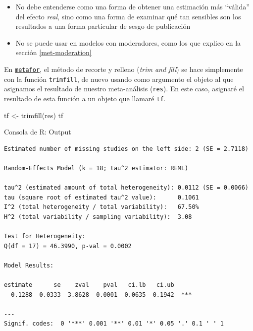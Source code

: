 \documentclass[
  bookmarksnumbered]{article}
\newenvironment{Shaded}{\begin{snugshade}}{\end{snugshade}}
\newcommand{\FunctionTok}[1]{\textcolor[rgb]{0.39,0.29,0.61}{#1}}
\newcommand{\NormalTok}[1]{\textcolor[rgb]{0.12,0.11,0.11}{#1}}
\newcommand{\OtherTok}[1]{\textcolor[rgb]{0.00,0.43,0.16}{#1}}
\begin{document}
\begin{itemize}
\item
  No debe entenderse como una forma de obtener una estimación más ``válida'' del efecto \emph{real}, sino como una forma de examinar qué tan sensibles son los resultados a una forma particular de sesgo de publicación
\item
  No se puede usar en modelos con moderadores, como los que explico en la sección \ref{met-moderation}
\end{itemize}

En \href{https://www.metafor-project.org/doku.php}{\texttt{metafor}}, el método de recorte y relleno (\emph{trim and fill}) se hace simplemente con la función \texttt{trimfill}, de nuevo usando como argumento el objeto al que asignamos el resultado de nuestro meta-análisis (\texttt{res}). En este caso, asignaré el resultado de esta función a un objeto que llamaré \texttt{tf}.

\begin{Shaded}
\begin{Highlighting}[]
\NormalTok{tf }\OtherTok{\textless{}{-}} \FunctionTok{trimfill}\NormalTok{(res)}
\NormalTok{tf}
\end{Highlighting}
\end{Shaded}

\begin{ROut}{Consola de R: Output~\thetcbcounter}
                \begin{footnotesize}
                \begin{verbatim} 
Estimated number of missing studies on the left side: 2 (SE = 2.7118)

Random-Effects Model (k = 18; tau^2 estimator: REML)

tau^2 (estimated amount of total heterogeneity): 0.0112 (SE = 0.0066)
tau (square root of estimated tau^2 value):      0.1061
I^2 (total heterogeneity / total variability):   67.50%
H^2 (total variability / sampling variability):  3.08

Test for Heterogeneity:
Q(df = 17) = 46.3990, p-val = 0.0002

Model Results:

estimate      se    zval    pval   ci.lb   ci.ub      
  0.1288  0.0333  3.8628  0.0001  0.0635  0.1942  *** 

---
Signif. codes:  0 '***' 0.001 '**' 0.01 '*' 0.05 '.' 0.1 ' ' 1
 \end{verbatim}
                \end{footnotesize}
                \end{ROut}
\end{document}
